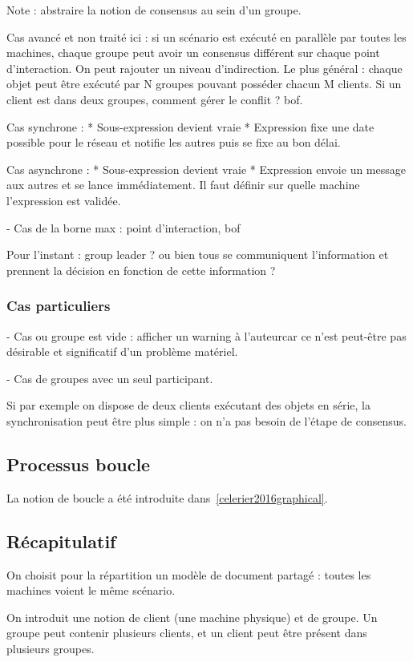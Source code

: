 \documentclass{article}
\newcommand\trigger{point d'interaction\xspace}
\begin{document}
Note : abstraire la notion de consensus au sein d'un groupe.

Cas avancé et non traité ici : si un scénario est exécuté en parallèle par toutes les machines, chaque groupe peut avoir un consensus différent sur chaque \trigger.
On peut rajouter un niveau d'indirection. Le plus général : chaque objet peut être exécuté par N groupes pouvant posséder chacun M clients.
Si un client est dans deux groupes, comment gérer le conflit ? bof.


Cas synchrone : 
* Sous-expression devient vraie
* Expression fixe une date possible pour le réseau et notifie les autres puis se fixe au bon délai.

Cas asynchrone : 
* Sous-expression devient vraie
* Expression envoie un message aux autres et se lance immédiatement.
Il faut définir sur quelle machine l'expression est validée.

- Cas de la borne max : \trigger, bof

Pour l'instant : group leader ? ou bien tous se communiquent l'information et prennent la décision en fonction de cette information ?


\subsubsection{Cas particuliers}
- Cas ou groupe est vide : afficher un warning à l'auteurcar ce n'est peut-être pas désirable et significatif d'un problème matériel.


- Cas de groupes avec un seul participant.

Si par exemple on dispose de deux clients exécutant des objets en série,
la synchronisation peut être plus simple : on n'a pas besoin de l'étape de consensus.
\subsection{Processus boucle}
La notion de boucle a été introduite dans~\ref{celerier2016graphical}.

\subsection{Récapitulatif}
On choisit pour la répartition un modèle de document partagé : toutes les machines voient le même scénario.

On introduit une notion de client (une machine physique) et de groupe.
Un groupe peut contenir plusieurs clients, et un client peut être présent dans plusieurs groupes.
\end{document}
